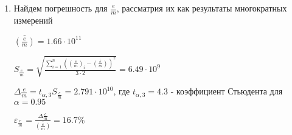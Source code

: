 \begin{enumerate}
    \item Найдем погрешность для $\frac{e}{m}$, рассматрия их как результаты многократных измерений
    
    $\displaystyle \overline{\left(\frac{e}{m}\right)} = 1.66 \cdot 10^{11}$

    $\displaystyle S_{\frac{e}{m}} = \sqrt{\frac{\sum_{i = 1}^n \left(\left(\frac{e}{m}\right)_i - \overline{\left(\frac{e}{m}\right)}\right)^2}{3 \cdot 2}} = 6.49 \cdot 10^9$

    $\displaystyle \Delta \frac{e}{m} = t_{\alpha,3} S_{\frac{e}{m}} = 2.791 \cdot 10^{10}$, где $t_{\alpha,3} = 4.3$ - коэффициент Стьюдента для $\alpha = 0.95$

    $\displaystyle \varepsilon_{\frac{e}{m}} = \frac{\Delta \frac{e}{m}}{\overline{\left(\frac{e}{m}\right)}} = 16.7\%$
\end{enumerate}